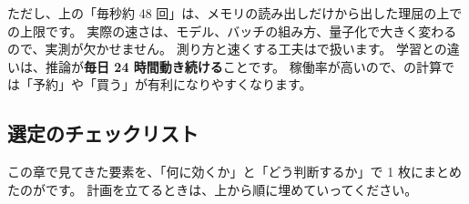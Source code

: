 ただし、上の「毎秒約 48 回」は、メモリの読み出しだけから出した理屈の上での上限です。
実際の速さは、モデル、バッチの組み方、量子化で大きく変わるので、実測が欠かせません。
測り方と速くする工夫はで扱います。
学習との違いは、推論が\textbf{毎日 24 時間動き続ける}ことです。
稼働率が高いので、の計算では「予約」や「買う」が有利になりやすくなります。

\subsection*{選定のチェックリスト}

この章で見てきた要素を、「何に効くか」と「どう判断するか」で 1 枚にまとめたのがです。
計画を立てるときは、上から順に埋めていってください。

